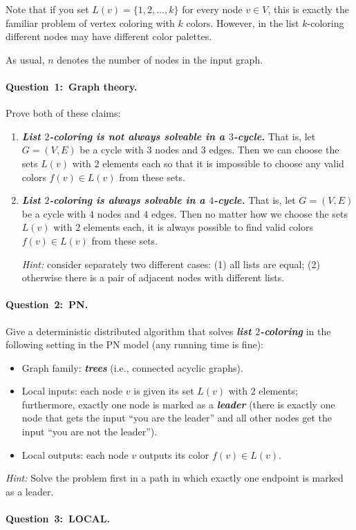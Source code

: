 \documentclass[12pt,a4paper]{article}
\newcommand{\q}[2]{\paragraph{\mbox{Question #1: }#2.}}
\newcommand{\cemph}[1]{\textbf{\emph{\boldmath #1}}}
\begin{document}
Note that if you set $L(v) = \{1,2,\dotsc,k\}$ for every node $v \in V$, this is exactly the familiar problem of vertex coloring with $k$ colors. However, in the list $k$-coloring different nodes may have different color palettes.

As usual, $n$ denotes the number of nodes in the input graph.

\newpage

\q{1}{Graph theory}

Prove both of these claims:
\begin{enumerate}[label=(\alph*)]
\item \cemph{List $2$-coloring is not always solvable in a $3$-cycle.} That is, let $G = (V,E)$ be a cycle with $3$ nodes and $3$ edges. Then we can choose the sets $L(v)$ with $2$ elements each so that it is impossible to choose any valid colors $f(v) \in L(v)$ from these sets.
\item \cemph{List $2$-coloring is always solvable in a $4$-cycle.} That is, let $G = (V,E)$ be a cycle with $4$ nodes and $4$ edges. Then no matter how we choose the sets $L(v)$ with $2$ elements each, it is always possible to find valid colors $f(v) \in L(v)$ from these sets.

\emph{Hint:} consider separately two different cases: (1) all lists are equal; (2) otherwise there is a pair of adjacent nodes with different lists.
\end{enumerate}


\q{2}{PN}

Give a deterministic distributed algorithm that solves \cemph{list $2$-coloring} in the following setting in the PN model (any running time is fine):
\begin{itemize}
    \item Graph family: \cemph{trees} (i.e., connected acyclic graphs).
    \item Local inputs: each node $v$ is given its set $L(v)$ with $2$ elements; furthermore, exactly one node is marked as a \cemph{leader} (there is exactly one node that gets the input ``you are the leader'' and all other nodes get the input ``you are not the leader'').
    \item Local outputs: each node $v$ outputs its color $f(v) \in L(v)$.
\end{itemize}
\emph{Hint:} Solve the problem first in a path in which exactly one endpoint is marked as a leader.

\q{3}{LOCAL}
\end{document}
